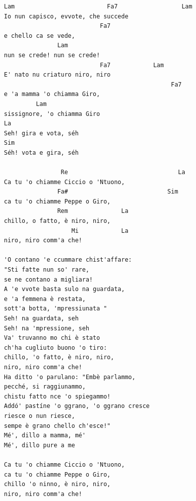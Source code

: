 \documentclass[a4paper]{article}
\begin{document}
\begin{Verbatim}[commandchars=\\\{\}]
Lam                          Fa7                  Lam
Io nun capisco, evvote, che succede 
                           Fa7
e chello ca se vede,
               Lam
nun se crede! nun se crede!
                           Fa7            Lam
E' nato nu criaturo niro, niro 
                                               Fa7
e 'a mamma 'o chiamma Giro,
         Lam           
sissignore, 'o chiamma Giro 
La                 
Seh! gira e vota, séh 
Sim
Séh! vota e gira, séh 

                Re                               La
Ca tu 'o chiamme Ciccio o 'Ntuono,
               Fa#                            Sim
ca tu 'o chiamme Peppe o Giro,
               Rem               La
chillo, o fatto, è niro, niro,
                   Mi            La
niro, niro comm'a che! 

'O contano 'e ccummare chist'affare:
"Sti fatte nun so' rare,
se ne contano a migliara!
A 'e vvote basta sulo na guardata,
e 'a femmena è restata,
sott'a botta, 'mpressiunata "
Seh! na guardata, seh 
Seh! na 'mpressione, seh 
Va' truvanno mo chi è stato
ch'ha cugliuto buono 'o tiro:
chillo, 'o fatto, è niro, niro,
niro, niro comm'a che! 
Ha ditto 'o parulano: "Embè parlammo,
pecché, si raggiunammo,
chistu fatto nce 'o spiegammo!
Addó' pastíne 'o ggrano, 'o ggrano cresce 
riesce o nun riesce,
sempe è grano chello ch'esce!"
Mé', dillo a mamma, mé' 
Mé', dillo pure a me 

Ca tu 'o chiamme Ciccio o 'Ntuono,
ca tu 'o chiamme Peppe o Giro,
chillo 'o ninno, è niro, niro,
niro, niro comm'a che! 
\end{Verbatim}
\newpage
\end{document}
